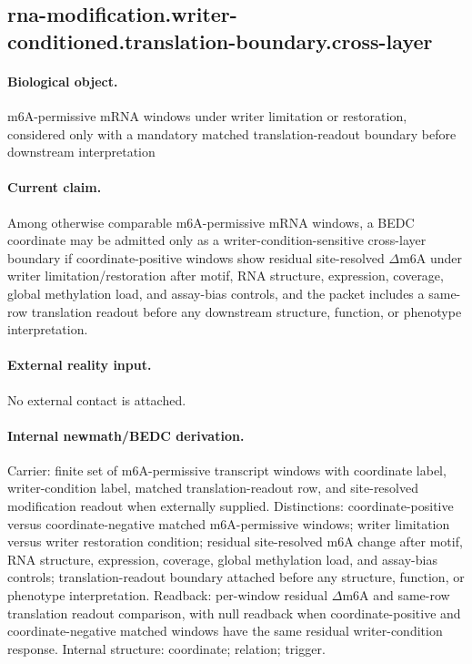 \subsection{rna-modification.writer-conditioned.translation-boundary.cross-layer}

\paragraph{Biological object.} m6A-permissive mRNA windows under writer limitation or restoration, considered only with a mandatory matched translation-readout boundary before downstream interpretation

\paragraph{Current claim.} Among otherwise comparable m6A-permissive mRNA windows, a BEDC coordinate may be admitted only as a writer-condition-sensitive cross-layer boundary if coordinate-positive windows show residual site-resolved \ensuremath{\Delta}m6A under writer limitation/restoration after motif, RNA structure, expression, coverage, global methylation load, and assay-bias controls, and the packet includes a same-row translation readout before any downstream structure, function, or phenotype interpretation.

\paragraph{External reality input.}
No external contact is attached.

\paragraph{Internal newmath/BEDC derivation.} Carrier: finite set of m6A-permissive transcript windows with coordinate label, writer-condition label, matched translation-readout row, and site-resolved modification readout when externally supplied. Distinctions: coordinate-positive versus coordinate-negative matched m6A-permissive windows; writer limitation versus writer restoration condition; residual site-resolved m6A change after motif, RNA structure, expression, coverage, global methylation load, and assay-bias controls; translation-readout boundary attached before any structure, function, or phenotype interpretation. Readback: per-window residual \ensuremath{\Delta}m6A and same-row translation readout comparison, with null readback when coordinate-positive and coordinate-negative matched windows have the same residual writer-condition response. Internal structure: coordinate; relation; trigger.

